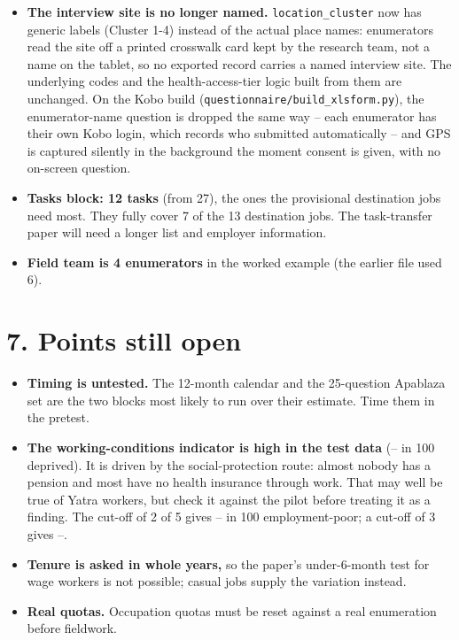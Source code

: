 \documentclass[10pt]{article}
\begin{document}
\begin{itemize}[leftmargin=1.2em,itemsep=2pt]
\item \textbf{The interview site is no longer named.} \texttt{location\_cluster} now has generic labels (Cluster 1-4) instead of the actual place names: enumerators read the site off a printed crosswalk card kept by the research team, not a name on the tablet, so no exported record carries a named interview site. The underlying codes and the health-access-tier logic built from them are unchanged. On the Kobo build (\texttt{questionnaire/build\_xlsform.py}), the enumerator-name question is dropped the same way -- each enumerator has their own Kobo login, which records who submitted automatically -- and GPS is captured silently in the background the moment consent is given, with no on-screen question.
\item \textbf{Tasks block: 12 tasks} (from 27), the ones the provisional destination jobs need most. They fully cover 7 of the 13 destination jobs. The task-transfer paper will need a longer list and employer information.
\item \textbf{Field team is 4 enumerators} in the worked example (the earlier file used 6).
\end{itemize}

\section*{7. Points still open}
\begin{itemize}[leftmargin=1.2em,itemsep=2pt]
\item \textbf{Timing is untested.} The 12-month calendar and the 25-question Apablaza set are the two blocks most likely to run over their estimate. Time them in the pretest.
\item \textbf{The working-conditions indicator is high in the test data} (-- in 100 deprived). It is driven by the social-protection route: almost nobody has a pension and most have no health insurance through work. That may well be true of Yatra workers, but check it against the pilot before treating it as a finding.
The cut-off of 2 of 5 gives -- in 100 employment-poor; a cut-off of 3 gives --.
\item \textbf{Tenure is asked in whole years,} so the paper's under-6-month test for wage workers is not possible; casual jobs supply the variation instead.
\item \textbf{Real quotas.} Occupation quotas must be reset against a real enumeration before fieldwork.
\end{itemize}
\end{document}
